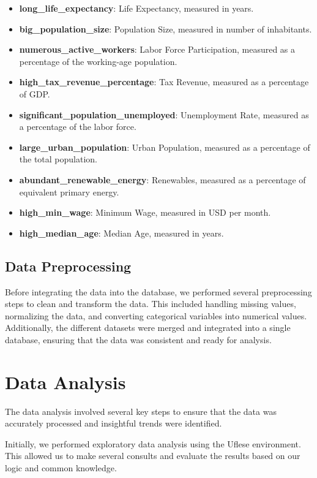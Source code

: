 \documentclass[fleqn,11pt]{article}
\begin{document}
\begin{itemize}
    \item \textbf{long\_life\_expectancy}: Life Expectancy, measured in years.
    \item \textbf{big\_population\_size}: Population Size, measured in number of inhabitants.
    \item \textbf{numerous\_active\_workers}: Labor Force Participation, measured as a percentage of the working-age population.
    \item \textbf{high\_tax\_revenue\_percentage}: Tax Revenue, measured as a percentage of GDP.
    \item \textbf{significant\_population\_unemployed}: Unemployment Rate, measured as a percentage of the labor force.
    \item \textbf{large\_urban\_population}: Urban Population, measured as a percentage of the total population.
    \item \textbf{abundant\_renewable\_energy}: Renewables, measured as a percentage of equivalent primary energy.
    \item \textbf{high\_min\_wage}: Minimum Wage, measured in USD per month.
    \item \textbf{high\_median\_age}: Median Age, measured in years.
\end{itemize}

\subsection{Data Preprocessing}

Before integrating the data into the database, we performed several preprocessing steps to clean and transform the data.
This included handling missing values, normalizing the data, and converting categorical variables into numerical values.
Additionally, the different datasets were merged and integrated into a single database, ensuring that the data was consistent and ready for analysis.

\newpage
\section{Data Analysis}

The data analysis involved several key steps to ensure that the data was accurately processed and insightful trends were identified.

Initially, we performed exploratory data analysis using the Uflese environment. This allowed us to make several consults and evaluate the results based on our logic and common knowledge. 
\end{document}
